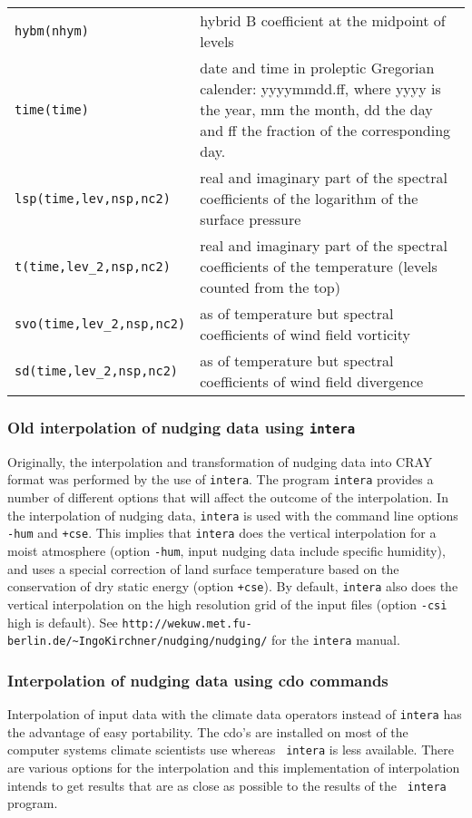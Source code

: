 \begin{appendix}
\begin{longtable}{l@{\extracolsep\fill}p{10.0cm}}
{\tt hybm(nhym)} & hybrid B coefficient at the midpoint of levels \\
{\tt time(time)} & date and time in proleptic Gregorian calender:
yyyymmdd.ff, where yyyy is the year, mm the month, dd the day and ff
the fraction of the corresponding day.\\
{\tt lsp(time,lev,nsp,nc2)} & real and imaginary part of the spectral
coefficients of the logarithm of the surface pressure \\
{\tt t(time,lev\_2,nsp,nc2)} & real and imaginary part of the spectral
  coefficients of the temperature (levels counted from the top)\\
{\tt svo(time,lev\_2,nsp,nc2)} & as of temperature but spectral
coefficients of wind field vorticity\\
{\tt sd(time,lev\_2,nsp,nc2)} & as of temperature but spectral
coefficients of wind field divergence\\\hline
\end{longtable}

\subsubsection{Old interpolation of nudging data using {\tt intera}}

Originally, the interpolation and transformation of nudging data into
CRAY format was performed by the use of {\tt intera}.
The program {\tt intera} provides a number of different options that
will affect the 
outcome of the interpolation. In the interpolation of nudging data,
{\tt intera} is
used with the command line options {\tt -hum} and {\tt +cse}. This implies that
{\tt intera} does the vertical interpolation for a moist atmosphere (option
{\tt -hum}, input nudging data include specific humidity), and uses a
special correction of land surface temperature based on the
conservation of dry static energy (option {\tt +cse}). By default, {\tt intera}
also does the vertical interpolation on the high resolution grid of
the input files (option {\tt -csi} high is default). See
\lstinline$http://wekuw.met.fu-berlin.de/~IngoKirchner/nudging/nudging/$
for the {\tt intera} manual. 

\subsubsection{Interpolation of nudging data using cdo commands}

Interpolation of input data with the climate data operators instead of
{\tt intera} has the advantage of easy portability. The cdo's are installed
on most of the computer systems climate scientists use whereas {\tt
  intera} is less available. There are various options for the
interpolation and this implementation of interpolation intends to get
results that are as close as possible to the results of the {\tt
  intera} program.


\end{appendix}
